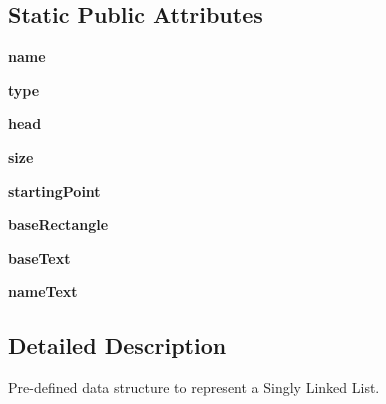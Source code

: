 \subsection*{Static Public Attributes}
\begin{DoxyCompactItemize}
\item 
\mbox{\label{class_singly_linked_list_1_1_singly_linked_list_a290bf002e85d460ea4d1b12eac95dccd}} 
{\bfseries name}
\item 
\mbox{\label{class_singly_linked_list_1_1_singly_linked_list_a523062fb5f8c37c3c55a3ac7bcb385cf}} 
{\bfseries type}
\item 
\mbox{\label{class_singly_linked_list_1_1_singly_linked_list_ae70237744ebaa52ad5d0fd4ad0553737}} 
{\bfseries head}
\item 
\mbox{\label{class_singly_linked_list_1_1_singly_linked_list_adef9daaead920d38b19c7f5a9e6f025f}} 
{\bfseries size}
\item 
\mbox{\label{class_singly_linked_list_1_1_singly_linked_list_a9b5e91c46108457bc497b06e781a0972}} 
{\bfseries starting\+Point}
\item 
\mbox{\label{class_singly_linked_list_1_1_singly_linked_list_a54b5b1f0bcb057e1b0e4380b27e4d882}} 
{\bfseries base\+Rectangle}
\item 
\mbox{\label{class_singly_linked_list_1_1_singly_linked_list_ab5991739cc77c0d955ec7abd3f885f16}} 
{\bfseries base\+Text}
\item 
\mbox{\label{class_singly_linked_list_1_1_singly_linked_list_a63451171839ddf5dea0beba8c3376b6c}} 
{\bfseries name\+Text}
\end{DoxyCompactItemize}


\subsection{Detailed Description}
Pre-\/defined data structure to represent a Singly Linked List. 


